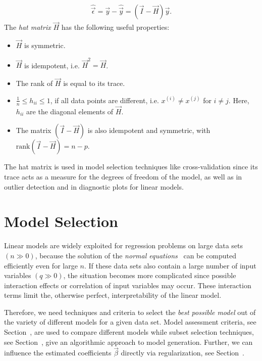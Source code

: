 \begin{align} \label{eq:residal_with_hat_matrix}
	\hat{\vec{\epsilon}} = \vec{y} - \hat{\vec{y}} = (\vec{I} - \vec{H}) \vec{y}.
\end{align}
%
The \emph{hat matrix} $\vec{H}$ has the following useful properties:

\begin{itemize}
	\item $\vec{H}$ is symmetric.
	\item $\vec{H}$ is idempotent, i.e. $\vec{H}^2 = \vec{H}$.
	\item The rank of $\vec{H}$ is equal to its trace.
 	\item $\frac{1}{n} \le h_{ii} \le 1$, if all data points are different, i.e. $x^{(i)} \ne x^{(j)}$ for $i \ne j$. Here, $h_{ii}$ are the diagonal elements of $\vec{H}$.
	\item The matrix $(\vec{I} - \vec{H})$ is also idempotent and symmetric, with $\mathrm{rank}(\vec{I} - \vec{H}) = n - p$.
\end{itemize}

The hat matrix is used in model selection techniques like cross-validation since its trace acts as a measure for the degrees of freedom of the model, as well as in outlier detection and in diagnostic plots for linear models.

\section{Model Selection} \label{sec:ModelSelection}

Linear models are widely exploited for regression problems on large data sets $(n \gg 0)$, because the solution of the \emph{normal equations}~ can be computed efficiently even for large $n$. If these data sets also contain a large number of input variables $(q \gg 0)$, the situation becomes more complicated since possible interaction effects or correlation of input variables may occur. These interaction terms limit the, otherwise perfect, interpretability of the linear model. 

Therefore, we need techniques and criteria to select the \emph{best possible model} out of the variety of different models for a given data set. Model assessment criteria, see Section~, are used to compare different models while subset selection techniques, see Section~, give an algorithmic approach to model generation. Further, we can influence the estimated coefficients $\vec{\beta}$ directly via regularization, see Section~. 

